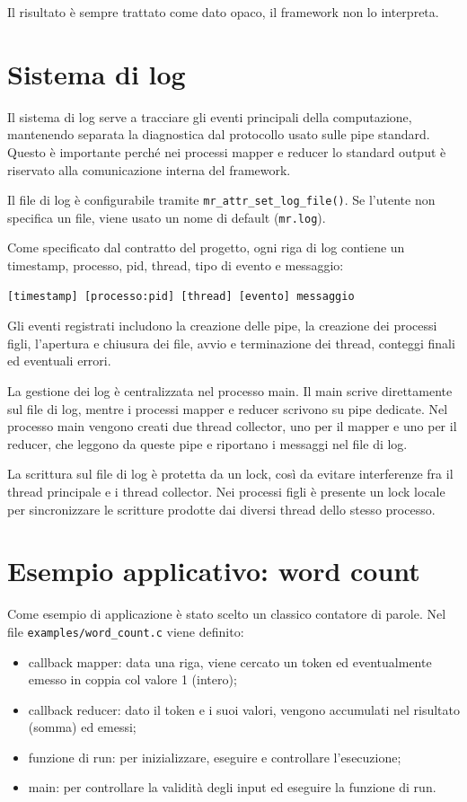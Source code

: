 \documentclass[11pt,a4paper]{article}
\begin{document}
Il risultato è sempre trattato come dato opaco, il framework non lo interpreta.

\section{Sistema di log}

Il sistema di log serve a tracciare gli eventi principali della computazione, mantenendo separata la diagnostica dal protocollo usato sulle pipe standard. Questo è importante perché nei processi mapper e reducer lo standard output è riservato alla comunicazione interna del framework.

Il file di log è configurabile tramite \texttt{mr\_attr\_set\_log\_file()}. Se l'utente non specifica un file, viene usato un nome di default (\texttt{mr.log}).

Come specificato dal contratto del progetto, ogni riga di log contiene un timestamp, processo, pid, thread, tipo di evento e messaggio:

\begin{verbatim}
[timestamp] [processo:pid] [thread] [evento] messaggio
\end{verbatim}

Gli eventi registrati includono la creazione delle pipe, la creazione dei processi figli, l'apertura e chiusura dei file, avvio e terminazione dei thread, conteggi finali ed eventuali errori.

La gestione dei log è centralizzata nel processo main. Il main scrive direttamente sul file di log, mentre i processi mapper e reducer scrivono su pipe dedicate. Nel processo main vengono creati due thread collector, uno per il mapper e uno per il reducer, che leggono da queste pipe e riportano i messaggi nel file di log.

La scrittura sul file di log è protetta da un lock, così da evitare interferenze fra il thread principale e i thread collector. Nei processi figli è presente un lock locale per sincronizzare le scritture prodotte dai diversi thread dello stesso processo.

\section{Esempio applicativo: word count}

Come esempio di applicazione è stato scelto un classico contatore di parole. Nel file \texttt{examples/word\_count.c} viene definito:

\begin{itemize}
    \item callback mapper: data una riga, viene cercato un token ed eventualmente emesso in coppia col valore 1 (intero);
    \item callback reducer: dato il token e i suoi valori, vengono accumulati nel risultato (somma) ed emessi;
    \item funzione di run: per inizializzare, eseguire e controllare l'esecuzione;
    \item main: per controllare la validità degli input ed eseguire la funzione di run.
\end{itemize}
\end{document}
